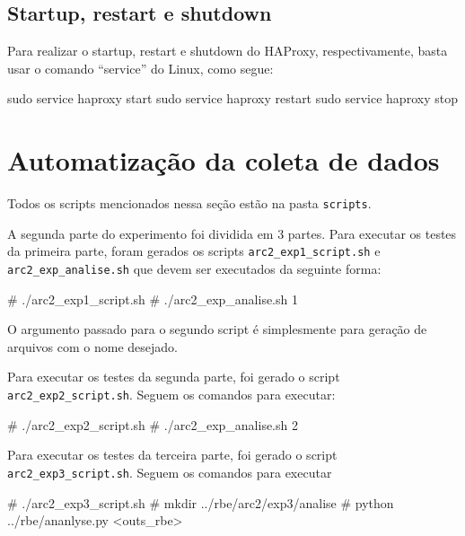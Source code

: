 \documentclass[a4paper,10pt]{article}
\begin{document}
    \subsection{Startup, restart e shutdown}

        Para realizar o startup, restart e shutdown do HAProxy, respectivamente, basta usar o comando “service” do Linux, como segue:

        \begin{spverbatim}
        sudo service haproxy start
        sudo service haproxy restart
        sudo service haproxy stop
        \end{spverbatim}


\section{Automatização da coleta de dados}

            Todos os scripts mencionados nessa seção estão na pasta \verb|scripts|.

	A segunda parte do experimento foi dividida em 3 partes. Para executar os testes da primeira parte, foram gerados os scripts \verb|arc2_exp1_script.sh| e \verb|arc2_exp_analise.sh| que devem ser executados da seguinte forma:

 	\begin{spverbatim}
	# ./arc2_exp1_script.sh
	# ./arc2_exp_analise.sh 1
	\end{spverbatim}
\noindent
\newline
O argumento passado para o segundo script é simplesmente para geração de arquivos com o nome desejado.
\newline

Para executar os testes da segunda parte, foi gerado o script \verb|arc2_exp2_script.sh|. Seguem os comandos para executar:
	\begin{spverbatim}
	# ./arc2_exp2_script.sh
	# ./arc2_exp_analise.sh 2
	\end{spverbatim}
\noindent
\newline
Para executar os testes da terceira parte, foi gerado o script \verb|arc2_exp3_script.sh|. Seguem os comandos para executar
	\begin{spverbatim}
	# ./arc2_exp3_script.sh
	# mkdir ../rbe/arc2/exp3/analise
	# python ../rbe/ananlyse.py <outs_rbe>
	\end{spverbatim}
\end{document}
